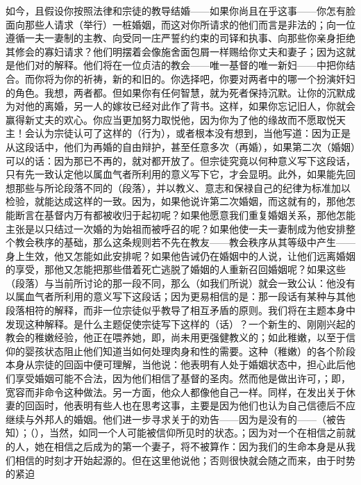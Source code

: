 如今，且假设你按照法律和宗徒的教导结婚——如果你尚且在乎这事——你怎有脸面向那些人请求（举行）一桩婚姻，而这对你所请求的他们而言是非法的；向一位遵循一夫一妻制的主教、向受同一庄严誓约约束的司铎和执事、向那些你亲身拒绝其修会的寡妇请求？他们明摆着会像施舍面包屑一样赐给你丈夫和妻子；因为这就是他们对的解释。他们将在一位贞洁的教会——唯一基督的唯一新妇——中把你结合。而你将为你的祈祷，新的和旧的。你选择吧，你要对两者中的哪一个扮演奸妇的角色。我想，两者都。但如果你有任何智慧，就为死者保持沉默。让你的沉默成为对他的离婚，另一人的嫁妆已经对此作了背书。这样，如果你忘记旧人，你就会赢得新丈夫的欢心。你应当更加努力取悦他，因为你为了他的缘故而不愿取悦天主！会认为宗徒认可了这样的（行为），或者根本没有想到，当他写道：因为正是从这段话中，他们为再婚的自由辩护，甚至任意多次（再婚），如果第二次（婚姻）可以的话：因为那已不再的，就对都开放了。但宗徒究竟以何种意义写下这段话，只有先一致认定他以属血气者所利用的意义写下它，才会显明。此外，如果能先回想那些与所论段落不同的（段落），并以教义、意志和保禄自己的纪律为标准加以检验，就能达成这样的一致。因为，如果他说许第二次婚姻，而这就有的，那他怎能断言在基督内万有都被收归于起初呢？如果他愿意我们重复婚姻关系，那他怎能主张是以只结过一次婚的为始祖而被呼召的呢？如果他使一夫一妻制成为他安排整个教会秩序的基础，那么这条规则若不先在教友——教会秩序从其等级中产生——身上生效，他又怎能如此安排呢？如果他告诫仍在婚姻中的人说，让他们远离婚姻的享受，那他又怎能把那些借着死亡逃脱了婚姻的人重新召回婚姻呢？如果这些（段落）与当前所讨论的那一段不同，那么（如我们所说）就会一致公认：他没有以属血气者所利用的意义写下这段话；因为更易相信的是：那一段话有某种与其他段落相符的解释，而非一位宗徒似乎教导了相互矛盾的原则。我们将在主题本身中发现这种解释。是什么主题促使宗徒写下这样的（话）？一个新生的、刚刚兴起的教会的稚嫩经验，他正在喂养她，即，尚未用更强健教义的；如此稚嫩，以至于信仰的婴孩状态阻止他们知道当如何处理肉身和性的需要。这种（稚嫩）的各个阶段本身从宗徒的回函中便可理解，当他说：他表明有人处于婚姻状态中，担心此后他们享受婚姻可能不合法，因为他们相信了基督的圣肉。然而他是做出许可，；即，宽容而非命令这种做法。另一方面，他众人都像他自己一样。同样，在发出关于休妻的回函时，他表明有些人也在思考这事，主要是因为他们也认为自己信德后不应继续与外邦人的婚姻。他们进一步寻求关于的劝告——因为是没有的——（被告知）；（），当然，如同一个人可能被信仰所见时的状态。；因为对一个在相信之前就的人，她在相信之后成为的第一个妻子，将不被算作：因为我们的生命本身是从我们相信的时刻才开始起源的。但在这里他说他；否则很快就会随之而来，由于时势的紧迫